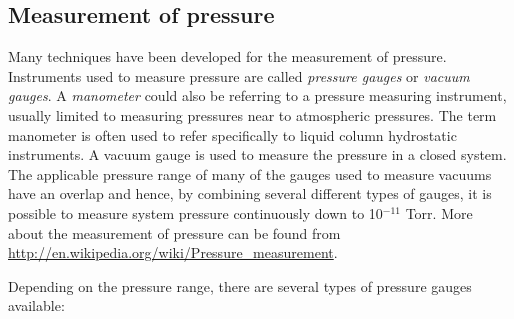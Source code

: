 \documentclass[byrevtex,amssymb,aps,pra,floatfix,letterpaper]{revtex4}
\begin{document}
\subsection{Measurement of pressure}

Many techniques have been developed for the measurement of pressure. Instruments used to measure pressure are called \textit{pressure gauges} or \textit{vacuum gauges}. A \textit{manometer} could also be referring to a pressure measuring instrument, usually limited to measuring pressures near to atmospheric pressures. The term manometer is often used to refer specifically to liquid column hydrostatic instruments. A vacuum gauge is used to measure the pressure in a closed system. The applicable pressure range of many of the gauges used to measure vacuums have an overlap and hence, by combining several different types of gauges, it is possible to measure system pressure continuously down to 10$^{-11}$ Torr. More about the measurement of pressure can be found from \url{http://en.wikipedia.org/wiki/Pressure_measurement}.

Depending on the pressure range, there are several types of pressure gauges available:
\end{document}
